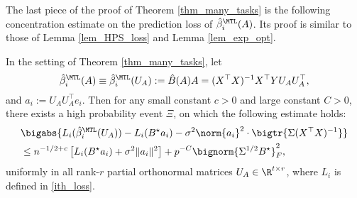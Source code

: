 \documentclass[aos,preprint]{imsart}
\begin{document}

	The last piece of the proof of Theorem \ref{thm_many_tasks} is the following concentration estimate on the prediction loss of $\hat{\beta}_i^{\MTL}(A)$. Its proof is similar to those of Lemma \ref{lem_HPS_loss} and Lemma \ref{lem_exp_opt}. 
	\begin{lemma}\label{claim_pred_err}
		In the setting of Theorem \ref{thm_many_tasks}, let 
		$$ \hat{\beta}_i^{\MTL}(A)\equiv \hat{\beta}_i^{\MTL}(U_A):= \hat{B}(A)A=(X^{\top} X)^{-1} X^{\top} Y U_A U_A^{\top} ,$$
		and ${a}_i := U_A U_A^{\top} e_i.$
	 Then for any small constant $c>0$ and large constant $C>0$, there exists a high probability event $\Xi$, on which the following estimate holds:
		\begin{align}
			&\bigabs{L_i(\hat{\beta}_i^{\MTL}(U_A)) - L_i(B^{\star} {a}_i) - \sigma^2 \norm{{a}_i}^2 \cdot \bigtr{\Sigma (X^{\top}X)^{-1}}}\nonumber \\
			&\le  n^{-1/2+c} \left[L_i(B^{\star} {a}_i) + \sigma^2 \| a_i\|^2\right] + p^{-C}  \bignorm{\Sigma^{1/2} B^{\star}}_F^2 ,\label{eq_Li_err}
		\end{align}
		uniformly in all rank-$r$ partial orthonormal matrices $U_A\in \R^{t\times r}$, where $L_i$ is defined
in \eqref{ith_loss}.
\end{lemma}
	
\end{document}
